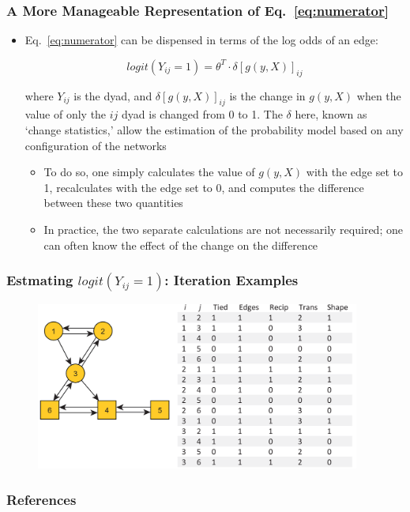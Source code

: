 \documentclass[show notes, aspectratio=1610]{beamer}
\begin{document}
\begin{frame}
  \frametitle{A More Manageable Representation of Eq.~\ref{eq:numerator}}
  \begin{itemize}
    \item 
  Eq.~\ref{eq:numerator} can be dispensed in terms of the log
  odds of an edge:

  \begin{equation}
    logit(Y_{ij} = 1) = \theta^{T} \cdot \delta[g(y, X)]_{ij}
  \end{equation}

  where $Y_{ij}$ is the dyad, and $\delta[g(y,X)]_{ij}$ is the change in $g(y,X)$ when the value of only the $ij$ dyad is changed from 0 to 1. The $\delta$ here, known as `change statistics,' allow the estimation of the probability model based on any configuration of the networks
\begin{itemize}
  \item To do so, one simply calculates the value of $g(y,X)$ with the edge set to 1, recalculates with the edge set to $0$, and computes the difference between these two quantities
  \small
  \item In practice, the two separate calculations are not necessarily required; one can often know the effect of the change on the difference
\end{itemize}
\end{itemize}
\end{frame}

\begin{frame}
  \frametitle{Estmating $logit(Y_{ij} = 1)$: Iteration Examples}
  \subtitle{Source is Rawlings et al's `suggested' handbook (page 320)}
  \begin{figure}
    \begin{center}
      \includegraphics[width=0.95\textwidth]{../images/iteration_steps.png}
    \end{center}
    \label{fig:ergm_iterations}
  \end{figure}
\end{frame}

\begin{frame}
	\frametitle{References}
	\printbibliography
 \end{frame} 


\end{document}
